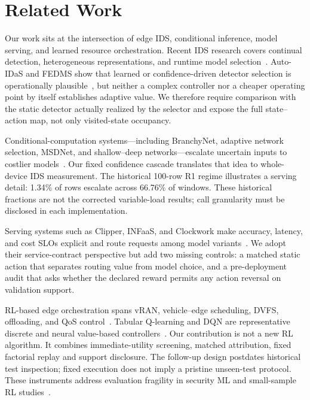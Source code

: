 \section{Related Work}
\label{sec:relwork}
Our work sits at the intersection of edge IDS, conditional inference, model serving, and learned resource orchestration. Recent IDS research covers continual detection, heterogeneous representations, and runtime model selection~\cite{Wang2024BFSNID,AOCIDS2024,StatAvg2025,DMIDS2025}. Auto-IDaS and FEDMS show that learned or confidence-driven detector selection is operationally plausible~\cite{Lin2024AutoIDaS,Hasan2026FEDMS}, but neither a complex controller nor a cheaper operating point by itself establishes adaptive value. We therefore require comparison with the static detector actually realized by the selector and expose the full state--action map, not only visited-state occupancy.

Conditional-computation systems---including BranchyNet, adaptive network selection, MSDNet, and shallow--deep networks---escalate uncertain inputs to costlier models~\cite{Teerapittayanon2016BranchyNet,Bolukbasi2017Adaptive,Huang2018MSDNet,Kaya2019ShallowDeep}. Our fixed confidence cascade translates that idea to whole-device IDS measurement. The historical 100-row R1 regime illustrates a serving detail: 1.34\% of rows escalate across 66.76\% of windows. These historical fractions are not the corrected variable-load results; call granularity must be disclosed in each implementation.

Serving systems such as Clipper, INFaaS, and Clockwork make accuracy, latency, and cost SLOs explicit and route requests among model variants~\cite{Crankshaw2017Clipper,Romero2021INFaaS,Gujarati2020Clockwork}. We adopt their service-contract perspective but add two missing controls: a matched static action that separates routing value from model choice, and a pre-deployment audit that asks whether the declared reward permits any action reversal on validation support.

RL-based edge orchestration spans vRAN, vehicle--edge scheduling, DVFS, offloading, and QoS control~\cite{Murti2024vRAN,Zhang2024VehicleEdge,Zhang2024DVFO,Lou2024Startup,Kim2024DistributedOffload,Maleki2024QCS,Nan2026RobustDNN,Wang2025TrustOffload,Hu2025SITOff}. Tabular Q-learning and DQN are representative discrete and neural value-based controllers~\cite{Watkins1992,Mnih2015}. Our contribution is not a new RL algorithm. It combines immediate-utility screening, matched attribution, fixed factorial replay and support disclosure. The follow-up design postdates historical test inspection; fixed execution does not imply a pristine unseen-test protocol. These instruments address evaluation fragility in security ML and small-sample RL studies~\cite{Arp2022,Agarwal2021}.
